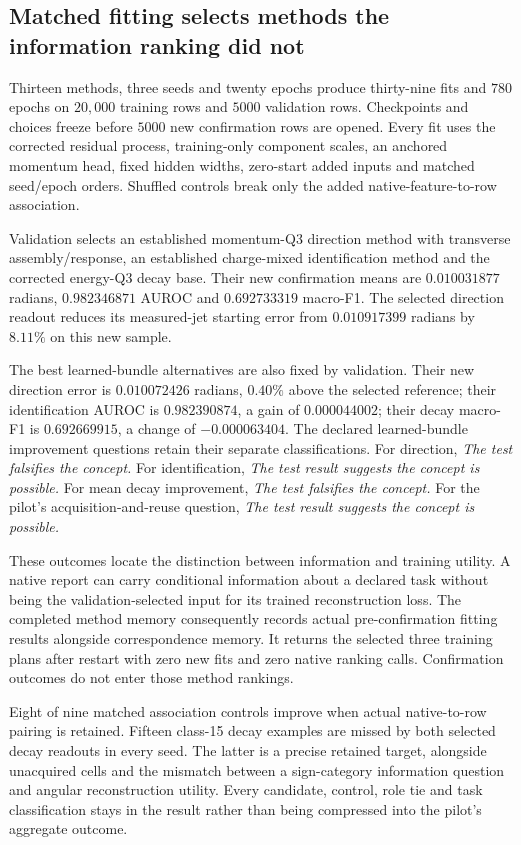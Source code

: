 \subsection{Matched fitting selects methods the information ranking did not}

Thirteen methods, three seeds and twenty epochs produce thirty-nine fits and $780$ epochs on $20{,}000$ training rows and $5000$ validation rows. Checkpoints and choices freeze before $5000$ new confirmation rows are opened. Every fit uses the corrected residual process, training-only component scales, an anchored momentum head, fixed hidden widths, zero-start added inputs and matched seed/epoch orders. Shuffled controls break only the added native-feature-to-row association. 

Validation selects an established momentum-Q3 direction method with transverse assembly/response, an established charge-mixed identification method and the corrected energy-Q3 decay base. Their new confirmation means are $0.010031877$ radians, $0.982346871$ AUROC and $0.692733319$ macro-F1. The selected direction readout reduces its measured-jet starting error from $0.010917399$ radians by $8.11\%$ on this new sample.

The best learned-bundle alternatives are also fixed by validation. Their new direction error is $0.010072426$ radians, $0.40\%$ above the selected reference; their identification AUROC is $0.982390874$, a gain of $0.000044002$; their decay macro-F1 is $0.692669915$, a change of $-0.000063404$. The declared learned-bundle improvement questions retain their separate classifications. For direction, \emph{The test falsifies the concept.} For identification, \emph{The test result suggests the concept is possible.} For mean decay improvement, \emph{The test falsifies the concept.} For the pilot's acquisition-and-reuse question, \emph{The test result suggests the concept is possible.}

These outcomes locate the distinction between information and training utility. A native report can carry conditional information about a declared task without being the validation-selected input for its trained reconstruction loss. The completed method memory consequently records actual pre-confirmation fitting results alongside correspondence memory. It returns the selected three training plans after restart with zero new fits and zero native ranking calls. Confirmation outcomes do not enter those method rankings.

Eight of nine matched association controls improve when actual native-to-row pairing is retained. Fifteen class-15 decay examples are missed by both selected decay readouts in every seed. The latter is a precise retained target, alongside unacquired cells and the mismatch between a sign-category information question and angular reconstruction utility. Every candidate, control, role tie and task classification stays in the result rather than being compressed into the pilot's aggregate outcome.

